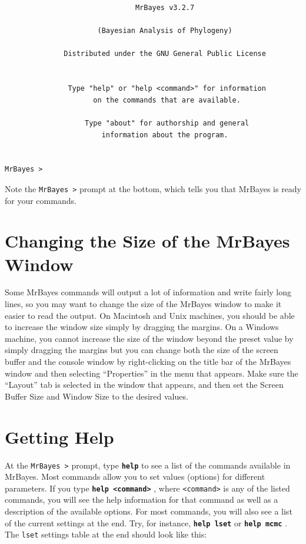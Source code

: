 \documentclass[12pt]{book}
\newcommand{\ttt}[1]{\texttt{#1} }
\newcommand{\tb}[1]{\texttt{\textbf{#1}} }
\begin{document}
\begin{singlespacing}
\small
\begin{verbatim}
                               MrBayes v3.2.7

                      (Bayesian Analysis of Phylogeny)

              Distributed under the GNU General Public License


               Type "help" or "help <command>" for information
                     on the commands that are available.

                   Type "about" for authorship and general
                       information about the program.


MrBayes >
\end{verbatim}
\normalsize
\end{singlespacing}

Note the \ttt{MrBayes >} prompt at the bottom, which tells you that MrBayes is ready for your commands.

\section{Changing the Size of the MrBayes Window}

Some MrBayes commands will output a lot of information and write fairly long lines, so
you may want to change the size of the MrBayes window to make it easier to read the
output. On Macintosh and Unix machines, you should be able to increase the window
size simply by dragging the margins. On a Windows machine, you cannot increase the
size of the window beyond the preset value by simply dragging the margins but you can
change both the size of the screen buffer and the
console window by right-clicking on the title bar of the MrBayes window and then
selecting ``Properties'' in the menu that appears. Make sure the ``Layout'' tab is selected in
the window that appears, and then set the Screen Buffer Size and Window Size to the
desired values.

\section{Getting Help}
\label{gettingHelp}

At the \ttt{MrBayes >} prompt, type \tb{help} to see a list of the commands available in
MrBayes. Most commands allow you to set values (options) for different parameters. If
you type \tb{help <command>}, where \ttt{<command>} is any of the listed commands, you
will see the help information for that command as well as a description of the available
options. For most commands, you will also see a list of the current settings at the end.
Try, for instance, \tb{help lset} or \tb{help mcmc}. The \ttt{lset} settings table at the end
should look like this:
\end{document}

